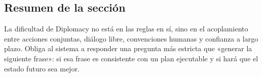 \subsection{Resumen de la sección}

La dificultad de Diplomacy no está en las reglas en sí, sino en el acoplamiento entre acciones conjuntas, diálogo libre, convenciones humanas y confianza a largo plazo. Obliga al sistema a responder una pregunta más estricta que «generar la siguiente frase»: si esa frase es consistente con un plan ejecutable y si hará que el estado futuro sea mejor.
